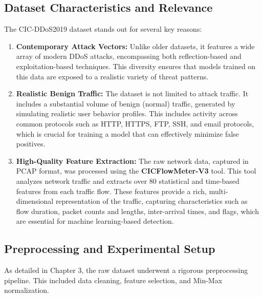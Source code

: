 \documentclass[16pt]{report}
\begin{document}
\subsection{Dataset Characteristics and Relevance}
The CIC-DDoS2019 dataset stands out for several key reasons:

\begin{enumerate}     \item \textbf{Contemporary Attack Vectors:} Unlike older datasets, it features a wide array of modern DDoS attacks, encompassing both reflection-based and exploitation-based techniques. This diversity ensures that models trained on this data are exposed to a realistic variety of threat patterns.

    \item \textbf{Realistic Benign Traffic:} The dataset is not limited to attack traffic. It includes a substantial volume of benign (normal) traffic, generated by simulating realistic user behavior profiles. This includes activity across common protocols such as HTTP, HTTPS, FTP, SSH, and email protocols, which is crucial for training a model that can effectively minimize false positives.

    \item \textbf{High-Quality Feature Extraction:} The raw network data, captured in PCAP format, was processed using the \textbf{CICFlowMeter-V3} tool. This tool analyzes network traffic and extracts over 80 statistical and time-based features from each traffic flow. These features provide a rich, multi-dimensional representation of the traffic, capturing characteristics such as flow duration, packet counts and lengths, inter-arrival times, and flags, which are essential for machine learning-based detection.
\end{enumerate} 

\subsection{Preprocessing and Experimental Setup}
As detailed in Chapter 3, the raw dataset underwent a rigorous preprocessing pipeline. This included data cleaning, feature selection, and Min-Max normalization.
\end{document}
